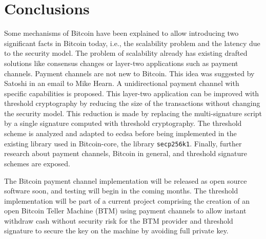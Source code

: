 \chapter{Conclusions}
\label{chap:conclusions}

Some mechanisms of Bitcoin have been explained to allow introducing two
significant facts in Bitcoin today, i.e., the scalability problem and the
latency due to the security model. The problem of scalability already has
existing drafted solutions like consensus changes or layer-two applications such
as payment channels. Payment channels are not new to Bitcoin. This idea was
suggested by Satoshi in an email to Mike Hearn. A unidirectional payment channel
with specific capabilities is proposed. This layer-two application can be
improved with threshold cryptography by reducing the size of the transactions
without changing the security model. This reduction is made by replacing the
multi-signature script by a single signature computed with threshold
cryptography. The threshold scheme is analyzed and adapted to \gls{ecdsa} before
being implemented in the existing library used in Bitcoin-core, the library
\texttt{secp256k1}. Finally, further research about payment channels, Bitcoin in
general, and threshold signature schemes are exposed.

The Bitcoin payment channel implementation will be released as open source
software soon, and testing will begin in the coming months. The threshold
implementation will be part of a current project comprising the creation of an
open Bitcoin Teller Machine (BTM) using payment channels to allow instant
withdraw cash without security risk for the BTM provider and threshold signature
to secure the key on the machine by avoiding full private key.
